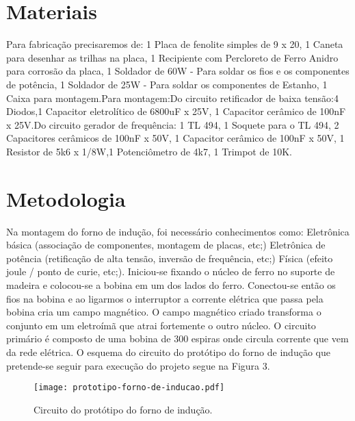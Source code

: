 \documentclass[a4paper,12pt]{article}%
\begin{document}
\section{Materiais}

Para fabricação precisaremos de: 
1 Placa de fenolite simples de 9 x 20, 1 Caneta para desenhar as trilhas na placa, 1 Recipiente com Percloreto de Ferro Anidro  para corrosão da placa, 1 Soldador de 60W - Para soldar os fios e os componentes de potência, 1 Soldador de 25W - Para soldar os componentes de Estanho, 1 Caixa para montagem.Para montagem:Do circuito retificador de baixa tensão:4 Diodos,1 Capacitor eletrolítico de 6800uF x 25V, 1 Capacitor cerâmico de 100nF x 25V.Do circuito gerador de frequência: 1  TL 494, 1  Soquete para o TL 494, 2  Capacitores cerâmicos de 100nF x 50V,  1  Capacitor cerâmico de 100nF x 50V, 1  Resistor de 5k6 x 1/8W,1  Potenciômetro de 4k7, 1  Trimpot de 10K.

\section{Metodologia}
Na montagem do forno de indução, foi necessário conhecimentos como:
 Eletrônica básica (associação de componentes, montagem de placas, etc;)
Eletrônica de potência (retificação de alta tensão, inversão de frequência, etc;)
Física (efeito joule / ponto de curie, etc;).
Iniciou-se fixando o núcleo de ferro no suporte de madeira e colocou-se a bobina em um dos lados do ferro. Conectou-se então os fios na bobina e ao ligarmos o interruptor a corrente elétrica que passa pela bobina cria um campo magnético. O campo magnético criado transforma o conjunto em um eletroímã que atrai fortemente o outro núcleo. O circuito primário é composto de uma bobina de 300 espiras onde circula corrente que vem da rede elétrica. 
O esquema do circuito do protótipo do forno de indução que pretende-se seguir para execução do projeto segue na Figura 3.

\newpage
\begin{figure}
	\centering	
	\texttt{[image: prototipo-forno-de-inducao.pdf]}
	\caption{Circuito do protótipo do forno de indução.}
	\label{fig:03}\cite{6}
\end{figure}
\end{document}
